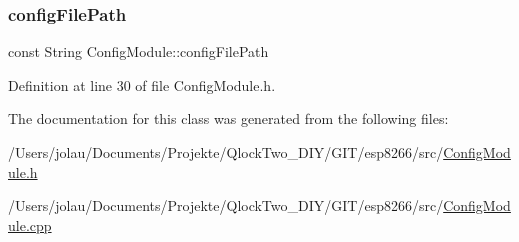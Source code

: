\subsubsection{\texorpdfstring{configFilePath}{configFilePath}}
{\footnotesize\ttfamily const String Config\+Module\+::config\+File\+Path\hspace{0.3cm}{\ttfamily [private]}}



Definition at line 30 of file Config\+Module.\+h.



The documentation for this class was generated from the following files\+:\begin{DoxyCompactItemize}
\item 
/\+Users/jolau/\+Documents/\+Projekte/\+Qlock\+Two\+\_\+\+D\+I\+Y/\+G\+I\+T/esp8266/src/\mbox{\hyperlink{_config_module_8h}{Config\+Module.\+h}}\item 
/\+Users/jolau/\+Documents/\+Projekte/\+Qlock\+Two\+\_\+\+D\+I\+Y/\+G\+I\+T/esp8266/src/\mbox{\hyperlink{_config_module_8cpp}{Config\+Module.\+cpp}}\end{DoxyCompactItemize}
